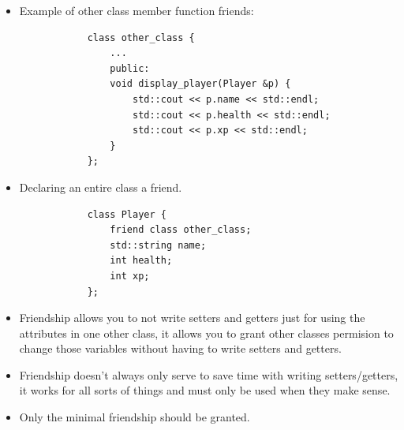 \begin{itemize}
    \item Example of other class member function friends:
        \begin{verbatim}
            class other_class {
                ...
                public:
                void display_player(Player &p) {
                    std::cout << p.name << std::endl;
                    std::cout << p.health << std::endl;
                    std::cout << p.xp << std::endl;
                }
            };
        \end{verbatim}
    
    \item Declaring an entire class a friend.
        \begin{verbatim}
            class Player {
                friend class other_class;
                std::string name;
                int health;
                int xp;
            };
        \end{verbatim}
    
    \item Friendship allows you to not write setters and getters just for using the attributes in one other class, it allows you to grant other classes permision to change those variables without having to write setters and getters.
    \item Friendship doesn't always only serve to save time with writing setters/getters, it works for all sorts of things and must only be used when they make sense.
    \item Only the minimal friendship should be granted.
\end{itemize}
